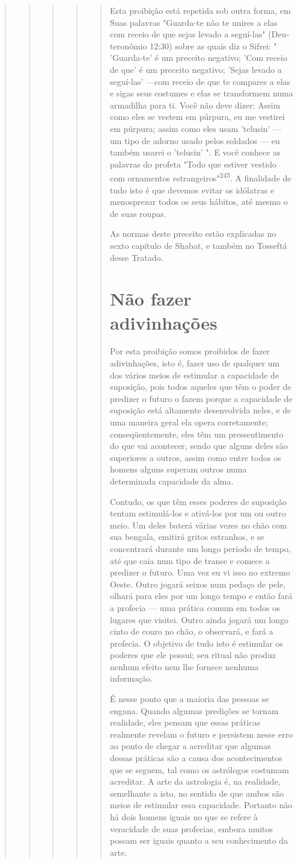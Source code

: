 \begin{quote}
\begin{quote}
\begin{quote}
\begin{quote}
\begin{quote}
Esta proibição está repetida sob outra forma, em Suas palavras
"Guarda-te não te unires a elas com receio de que sejas levado a
seguí-las" (Deu­teronômio 12:30) sobre as quais diz o Sifrei: "
'Guarda-te' é um preceito nega­tivo; 'Com receio de que' é um preceito
negativo; 'Sejas levado a seguí-las' ---com receio de que te compares a
elas e sigas seus costumes e elas se transfor­mem numa armadilha para
ti. Você não deve dizer: Assim como eles se vestem em púrpura, eu me
vestirei em púrpura; assim como eles usam 'telusin' --- um tipo de
adorno usado pelos soldados --- eu também usarei o 'telusin' ". E você
conhece as palavras do profeta "Todo que estiver vestido com ornamentos
es­trangeiros"\textsuperscript{245}. A finalidade de tudo isto é que
devemos evitar os idólatras e menosprezar todos os seus hábitos, até
mesmo o de suas roupas.

As normas deste preceito estão explicadas no sexto capítulo de Sha­bat,
e também no Tosseftá desse Tratado.

\section{Não fazer adivinhações}

Por esta proibição somos proibidos de fazer adivinhações, isto é, fa­zer
uso de qualquer um dos vários meios de estimular a capacidade de
suposi­ção, pois todos aqueles que têm o poder de predizer o futuro o
fazem porque a capacidade de suposição está altamente desenvolvida
neles, e de uma manei­ra geral ela opera corretamente; conseqüentemente,
eles têm um pressentimento do que vai acontecer, sendo que alguns deles
são superiores a outros, assim como entre todos os homens alguns superam
outros numa determinada capa­cidade da alma.

Contudo, os que têm esses poderes de suposição tentam estimulá-los e
ativá-los por um ou outro meio. Um deles baterá várias vezes no chão com
sua bengala, emitirá gritos estranhos, e se concentrará durante um longo
perío­do de tempo, até que caia num tipo de transe e comece a predizer o
futuro. Uma vez eu vi isso no extremo Oeste. Outro jogará seixos num
pedaço de pele, olhará para eles por um longo tempo e então fará a
profecia --- uma prática co­mum em todos os lugares que visitei. Outro
ainda jogará um longo cinto de couro no chão, o observará, e fará a
profecia. O objetivo de tudo isto é estimu­lar os poderes que ele
possui; seu ritual não produz nenhum efeito nem lhe fornece nenhuma
informação.

É nesse ponto que a maioria das pessoas se engana. Quando algumas
predições se tornam realidade, eles pensam que essas práticas realmente
reve­lam o futuro e persistem nesse erro ao ponto de chegar a acreditar
que algumas dessas práticas são a causa dos acontecimentos que se
seguem, tal como os as­trólogos costumam acreditar. A arte da astrologia
é, na realidade, semelhante a isto, no sentido de que ambos são meios de
estimular essa capacidade. Portanto não há 
dois homens iguais no que se refere à veracidade de suas
profe­cias, embora muitos possam ser iguais quanto a seu conhecimento da
arte.


\end{quote}
\end{quote}
\end{quote}
\end{quote}
\end{quote}
